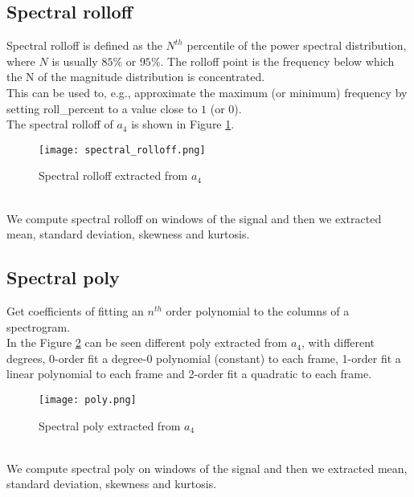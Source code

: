 \subsection{Spectral rolloff}
Spectral rolloff is defined as the $N^{th}$ percentile of the power spectral distribution, where $N$ is usually $85 \%$ or $95 \%$. The rolloff point is the frequency below which the N of the magnitude distribution is concentrated.
\\
This can be used to, e.g., approximate the maximum (or minimum) frequency by setting roll\_percent to a value close to $1$ (or $0$).
\\
The spectral rolloff of $a_4$ is shown in Figure \ref{fig:spectral_rolloff}.
\begin{figure}[h]
    \centering
    \texttt{[image: spectral\_rolloff.png]} 
	\caption{Spectral rolloff extracted from $a_4$}
    \label{fig:spectral_rolloff}
\end{figure}
\\
We compute spectral rolloff on windows of the signal and then we extracted mean, standard deviation, skewness and kurtosis.

\subsection{Spectral poly}
Get coefficients of fitting an $n^{th}$ order polynomial to the columns of a spectrogram.
\\
In the Figure \ref{fig:poly} can be seen different poly extracted from $a_4$, with different degrees, 0-order fit a degree-0 polynomial (constant) to each frame, 1-order fit a linear polynomial to each frame and 2-order fit a quadratic to each frame.
\begin{figure}[h]
    \centering
    \texttt{[image: poly.png]} 
	\caption{Spectral poly extracted from $a_4$}
    \label{fig:poly}
\end{figure}
\\
We compute spectral poly on windows of the signal and then we extracted mean, standard deviation, skewness and kurtosis.

